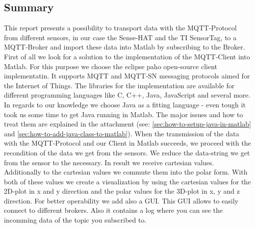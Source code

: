 \documentclass[12pt]{article}
\begin{document}
\subsection{Summary}
This report presents a possibility to transport data with the MQTT-Protocol from different sensors, in our case the Sense-HAT and the TI SensorTag, to a MQTT-Broker and import these data into Matlab by subscribing to the Broker. First of all we look for a solution to the implementation of the MQTT-Client into Matlab. For this purpose we choose the eclipse paho open-source client implementatin. It supports MQTT and MQTT-SN messaging protocols aimed for the Internet of Things. The libraries for the implementation are available for different programming languages like C, C++, Java, JavaScript and several more. In regards to our knowledge we choose Java as a fitting language - even tough it took us some time to get Java running in Matlab. The major issues and how to treat them are explained in the attachment (see: \ref{sec:how-to-setup-java-in-matlab} and \ref{sec:how-to-add-java-class-to-matlab}). When the transmission of the data with the MQTT-Protocol and our Client in Matlab succeeds, we proceed with the recondition of the data we get from the sensors. We reduce the data-string we get from the sensor to the necessary. In result we receive cartesian values. Additionally to the cartesian values we commute them into the polar form. With both of these values we create a visualization by using the cartesian values for the 2D-plot in x and y direction and the polar values for the 3D-plot in x, y and z direction. For better operability we add also a GUI. This GUI allows to easily connect to different brokers. Also it contains a log where you can see the incomming data of the topic you subscribed to.  
\end{document}
